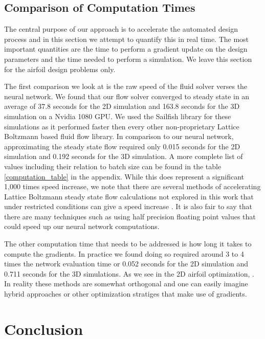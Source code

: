 \documentclass{article} %
\begin{document}
\subsection{Comparison of Computation Times}

The central purpose of our approach is to accelerate the automated design process and in this section we attempt to quantify this in real time. The most important quantities are the time to perform a gradient update on the design parameters and the time needed to perform a simulation. We leave this section for the airfoil design problems only.

The first comparison we look at is the raw speed of the fluid solver verses the neural network. We found that our flow solver converged to steady state in an average of 37.8 seconds for the 2D simulation and 163.8 seconds for the 3D simulation on a Nvidia 1080 GPU. We used the Sailfish library \cite{januszewski2014sailfish} for these simulations as it performed faster then every other non-proprietary Lattice Boltzmann based fluid flow library. In comparison to our neural network, approximating the steady state flow required only 0.015 seconds for the 2D simulation and 0.192 seconds for the 3D simulation. A more complete list of values including their relation to batch size can be found in the table \ref{computation_table} in the appendix. While this does represent a significant 1,000 times speed increase, we note that there are several methods of accelerating Lattice Boltzmann steady state flow calculations not explored in this work that under restricted conditions can give a speed increase \cite{guo2013lattice} \cite{bernaschi2002computing}. It is also fair to say that there are many techniques such as using half precision floating point values that could speed up our neural network computations.

The other computation time that needs to be addressed is how long it takes to compute the gradients. In practice we found doing so required around 3 to 4 times the network evaluation time or 0.052 seconds for the 2D simulation and 0.711 seconds for the 3D simulations. As we see in the 2D airfoil optimization, . In reality these methods are somewhat orthogonal and one can easily imagine hybrid approaches or other optimization stratiges that make use of gradients.

\section{Conclusion}
\end{document}
